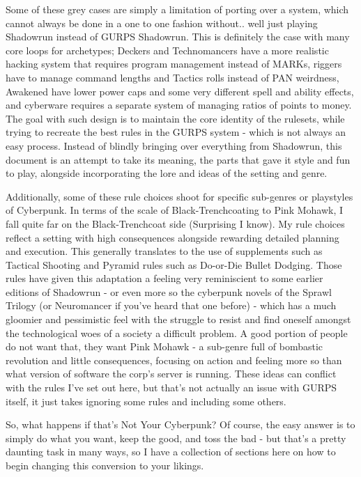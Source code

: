 \begin{multicols*}{2}
	Some of these grey cases are simply a limitation of porting over a system, which cannot always be done in a one to one fashion without.. well just playing Shadowrun instead of GURPS Shadowrun. This is definitely the case with many core loops for archetypes; Deckers and Technomancers have a more realistic hacking system that requires program management instead of MARKs, riggers have to manage command lengths and Tactics rolls instead of PAN weirdness, Awakened have lower power caps and some very different spell and ability effects, and cyberware requires a separate system of managing ratios of points to money. The goal with such design is to maintain the core identity of the rulesets, while trying to recreate the best rules in the GURPS system - which is not always an easy process. Instead of blindly bringing over everything from Shadowrun, this document is an attempt to take its meaning, the parts that gave it style and fun to play, alongside incorporating the lore and ideas of the setting and genre.
	
	Additionally, some of these rule choices shoot for specific sub-genres or playstyles of Cyberpunk. In terms of the scale of Black-Trenchcoating to Pink Mohawk, I fall quite far on the Black-Trenchcoat side (Surprising I know). My rule choices reflect a setting with high consequences alongside rewarding detailed planning and execution. This generally translates to the use of supplements such as Tactical Shooting and Pyramid rules such as Do-or-Die Bullet Dodging. Those rules have given this adaptation a feeling very reminiscient to some earlier editions of Shadowrun - or even more so the cyberpunk novels of the Sprawl Trilogy (or Neuromancer if you've heard that one before) - which has a much gloomier and pessimistic feel with the struggle to resist and find oneself amongst the technological woes of a society a difficult problem. A good portion of people do not want that, they want Pink Mohawk - a sub-genre full of bombastic revolution and little consequences, focusing on action and feeling more so than what version of software the corp's server is running. These ideas can conflict with the rules I've set out here, but that's not actually an issue with GURPS itself, it just takes ignoring some rules and including some others.
	
	So, what happens if that's Not Your Cyberpunk? Of course, the easy answer is to simply do what you want, keep the good, and toss the bad - but that's a pretty daunting task in many ways, so I have a collection of sections here on how to begin changing this conversion to your likings.
	

\end{multicols*}
